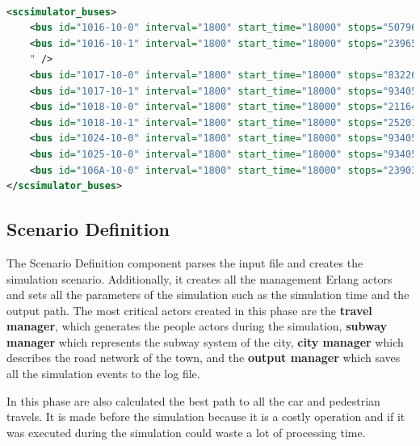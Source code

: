 \renewcommand{\thelstlisting}{\arabic{lstlisting}}
\lstset{language=XML}
\begin{lstlisting}[language=xml, caption=Definition of the city buses, label=list:buses, upquote=true]

<scsimulator_buses>
    <bus id="1016-10-0" interval="1800" start_time="18000" stops="507969889,2390204059,507969889,1400446171" />
    <bus id="1016-10-1" interval="1800" start_time="18000" stops="2396517544,163220296,2390192810,2390192798
    " />
    <bus id="1017-10-0" interval="1800" start_time="18000" stops="832264854,1758396031,832264854,2448473366" />
    <bus id="1017-10-1" interval="1800" start_time="18000" stops="934050061,2109902387,2448473366,832264854" />
    <bus id="1018-10-0" interval="1800" start_time="18000" stops="2116463109,2390204059,507969889,2390204059" />
    <bus id="1018-10-1" interval="1800" start_time="18000" stops="2520196336,507969946,410243261,410243260" />
    <bus id="1024-10-0" interval="1800" start_time="18000" stops="934050061,1430544803,917144410,1430544803,917144410" />
    <bus id="1025-10-0" interval="1800" start_time="18000" stops="934050061,1430544803,917144410,1430544803" />
    <bus id="106A-10-0" interval="1800" start_time="18000" stops="2390339037,1709028082,185795118,929591881" />
</scsimulator_buses>

\end{lstlisting}

\subsection{Scenario Definition}

The Scenario Definition component parses the input file and creates the simulation scenario. Additionally, it creates all the management Erlang actors and sets all the parameters of the simulation such as the simulation time and the output path. The most critical actors created in this phase are the \textbf{travel manager}, which generates the people actors during the simulation, \textbf{subway manager} which represents the subway system of the city, \textbf{city manager} which describes the road network of the town, and the \textbf{output manager} which saves all the simulation events to the log file.

In this phase are also calculated the best path to all the car and pedestrian travels. It is made before the simulation because it is a costly operation and if it was executed during the simulation could waste a lot of processing time.

